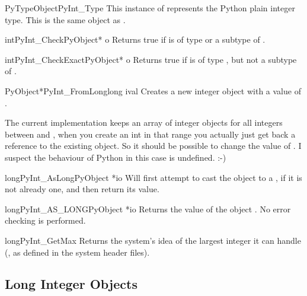 \begin{cvardesc}{PyTypeObject}{PyInt_Type}
  This instance of  represents the Python plain
  integer type.  This is the same object as .
\end{cvardesc}

\begin{cfuncdesc}{int}{PyInt_Check}{PyObject* o}
  Returns true if  is of type  or a subtype
  of .
\end{cfuncdesc}

\begin{cfuncdesc}{int}{PyInt_CheckExact}{PyObject* o}
  Returns true if  is of type , but not a
  subtype of .
\end{cfuncdesc}

\begin{cfuncdesc}{PyObject*}{PyInt_FromLong}{long ival}
  Creates a new integer object with a value of .

  The current implementation keeps an array of integer objects for all
  integers between  and , when you create an int in
  that range you actually just get back a reference to the existing
  object. So it should be possible to change the value of .  I
  suspect the behaviour of Python in this case is undefined. :-)
\end{cfuncdesc}

\begin{cfuncdesc}{long}{PyInt_AsLong}{PyObject *io}
  Will first attempt to cast the object to a , if
  it is not already one, and then return its value.
\end{cfuncdesc}

\begin{cfuncdesc}{long}{PyInt_AS_LONG}{PyObject *io}
  Returns the value of the object .  No error checking is
  performed.
\end{cfuncdesc}

\begin{cfuncdesc}{long}{PyInt_GetMax}{}
  Returns the system's idea of the largest integer it can handle
  (, as defined in the system
  header files).
\end{cfuncdesc}


\subsection{Long Integer Objects \label{longObjects}}

